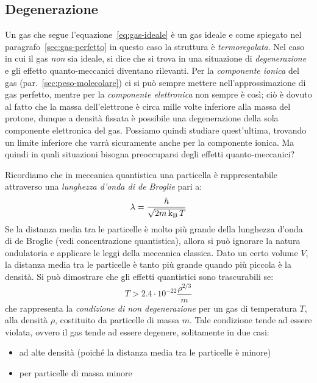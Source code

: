 \subsection{Degenerazione}\label{sec:degenerazione}
Un gas che segue l'equazione~\eqref{eq:gas-ideale} è un gas ideale e come spiegato nel paragrafo~\ref{sec:gas-perfetto} in questo caso la struttura è \emph{termoregolata}. Nel caso in cui il gas \emph{non} sia ideale, si dice che si trova in una situazione di \emph{degenerazione} e gli effetto quanto-meccanici diventano rilevanti. Per la \emph{componente ionica} del gas (par.~\ref{sec:peso-molecolare}) ci si può sempre mettere nell'approssimazione di gas perfetto, mentre per la \emph{componente elettronica} non sempre è così; ciò è dovuto al fatto che la massa dell'elettrone è circa mille volte inferiore alla massa del protone, dunque a densità fissata è possibile una degenerazione della sola componente elettronica del gas. Possiamo quindi studiare quest'ultima, trovando un limite inferiore che varrà sicuramente anche per la componente ionica. Ma quindi in quali situazioni bisogna preoccuparsi degli effetti quanto-meccanici?

Ricordiamo che in meccanica quantistica una particella è rappresentabile attraverso una \emph{lunghezza d'onda di de Broglie} pari a:
\begin{equation}\label{eq:lunghezza-de-broglie}
    \lambda = \dfrac{h}{\sqrt{2 m \operatorname{k_B} T}}
\end{equation}
Se la distanza media tra le particelle è molto più grande della lunghezza d'onda di de Broglie (vedi concentrazione quantistica), allora si può ignorare la natura ondulatoria e applicare le leggi della meccanica classica. Dato un certo volume $V$, la distanza media tra le particelle è tanto più grande quando più piccola è la densità. Si può dimostrare che gli effetti quantistici sono trascurabili se:
\[
T > 2.4\cdot 10^{-22} \frac{\rho^{2/3}}{m}
\]
che rappresenta la \emph{condizione di non degenerazione} per un gas di temperatura $T$, alla densità $\rho$, costituito da particelle di massa $m$. Tale condizione tende ad essere violata, ovvero il gas tende ad essere degenere, solitamente in due casi:
\begin{itemize}
    \item ad alte densità (poiché la distanza media tra le particelle è minore)
    \item  per particelle di massa minore
\end{itemize}

